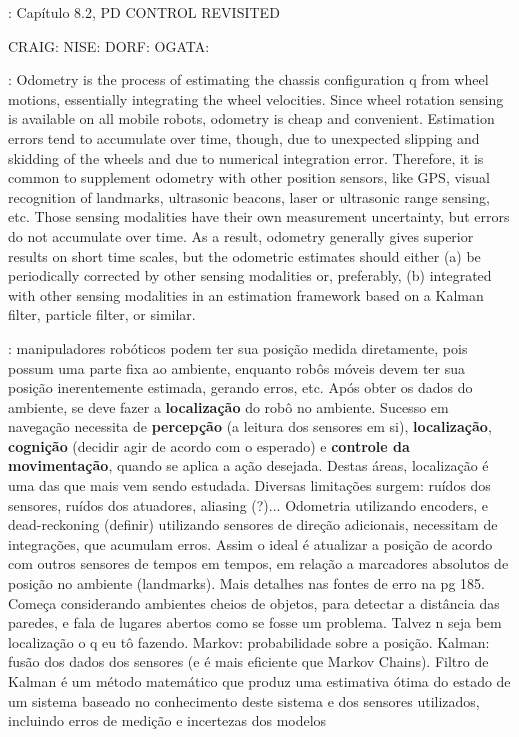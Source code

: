 \cite{spong2005robot}: Capítulo 8.2, PD CONTROL REVISITED

CRAIG:
NISE:
DORF:
OGATA:

\cite{lynch2017modern}: Odometry is the process of estimating the chassis configuration q from wheel motions, essentially integrating the wheel velocities. Since wheel rotation sensing is available on all mobile robots, odometry is cheap and convenient. Estimation errors tend to accumulate over time, though, due to unexpected slipping and skidding of the wheels and due to numerical integration error. Therefore, it is common to supplement odometry with other position sensors, like GPS, visual recognition of landmarks, ultrasonic beacons, laser or ultrasonic range sensing, etc. Those sensing modalities have their own measurement uncertainty, but errors do not accumulate over time. As a result, odometry generally gives superior results on short time scales, but the odometric estimates should either (a) be periodically corrected by other sensing modalities or, preferably, (b) integrated with other sensing modalities in an estimation framework based on a Kalman filter, particle filter, or similar.

\cite{siegwart2011introduction}: manipuladores robóticos podem ter sua posição medida diretamente, pois possum uma parte fixa ao ambiente, enquanto robôs móveis devem ter sua posição inerentemente estimada, gerando erros, etc. Após obter os dados do ambiente, se deve fazer a \textbf{localização} do robô no ambiente. Sucesso em navegação necessita de \textbf{percepção} (a leitura dos sensores em si), \textbf{localização}, \textbf{cognição} (decidir agir de acordo com o esperado) e \textbf{controle da movimentação}, quando se aplica a ação desejada. Destas áreas, localização é uma das que mais vem sendo estudada. Diversas limitações surgem: ruídos dos sensores, ruídos dos atuadores, aliasing (?)... Odometria utilizando encoders, e dead-reckoning (definir) utilizando sensores de direção adicionais, necessitam de integrações, que acumulam erros. Assim o ideal é atualizar a posição de acordo com outros sensores de tempos em tempos, em relação a marcadores absolutos de posição no ambiente (landmarks). Mais detalhes nas fontes de erro na pg 185. Começa considerando ambientes cheios de objetos, para detectar a distância das paredes, e fala de lugares abertos como se fosse um problema. Talvez n seja bem localização o q eu tô fazendo. Markov: probabilidade sobre a posição. Kalman: fusão dos dados dos sensores (e é mais eficiente que Markov Chains). Filtro de Kalman é um método matemático que produz uma estimativa ótima do estado de um sistema baseado no conhecimento deste sistema e dos sensores utilizados, incluindo erros de medição e incertezas dos modelos

